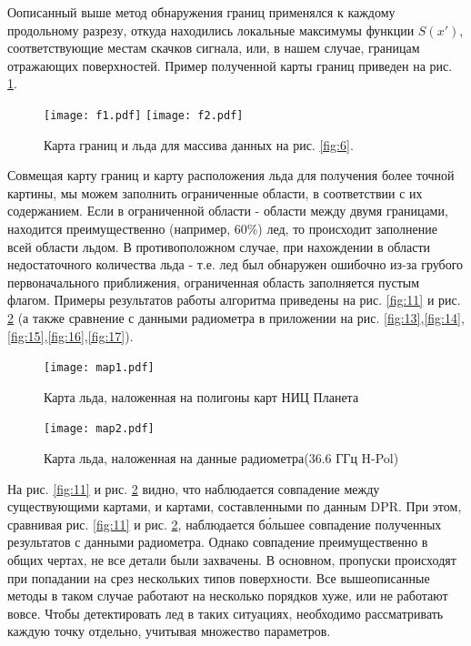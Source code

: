 Оописанный выше метод обнаружения границ применялся к каждому продольному разрезу, откуда находились локальные
максимумы функции $S(x')$, соответствующие местам скачков сигнала, или, в нашем случае, границам отражающих
поверхностей. Пример полученной карты границ приведен на рис. \ref{fig:10}.

\begin{figure}[h!]
  \centering
  \texttt{[image: f1.pdf]}
  \texttt{[image: f2.pdf]}
  \caption{Карта границ и льда для массива данных на рис. \ref{fig:6}.}
  \label{fig:10}
\end{figure}

Совмещая карту границ и карту расположения льда для получения более точной картины, мы можем заполнить ограниченные
области, в соответствии с их содержанием. Если в ограниченной области - области между двумя границами, находится
преимущественно (например, 60\%) лед, то происходит заполнение всей
области льдом. В противоположном случае, при нахождении в области недостаточного количества льда - т.е. лед был
обнаружен ошибочно из-за грубого первоначального приближения, ограниченная область заполняется пустым флагом.
Примеры результатов работы алгоритма приведены на рис. \ref{fig:11} и рис. \ref{fig:12} (а также сравнение с данными радиометра в приложении
на рис. \ref{fig:13},\ref{fig:14},\ref{fig:15},\ref{fig:16},\ref{fig:17}).

\begin{figure}[h!]
  \centering
  \begin{minipage}{0.48\linewidth}
    \texttt{[image: map1.pdf]}
    \caption{Карта льда, наложенная на полигоны карт НИЦ Планета}
    \label{fig:11}
  \end{minipage}
  \begin{minipage}{0.51\linewidth}
    \texttt{[image: map2.pdf]}
    \caption{Карта льда, наложенная на данные радиометра(36.6 ГГц H-Pol)}
    \label{fig:12}
  \end{minipage}

\end{figure}

На рис. \ref{fig:11} и рис. \ref{fig:12} видно, что наблюдается совпадение между существующими картами, и картами, составленными
по данным DPR. При этом, сравнивая рис. \ref{fig:11} и рис. \ref{fig:12}, наблюдается б\'{о}льшее совпадение полученных
результатов с данными радиометра. Однако совпадение преимущественно в общих чертах, не все детали были захвачены. В основном,
пропуски происходят при попадании на срез нескольких типов поверхности. Все вышеописанные методы в таком случае работают на несколько порядков
хуже, или не работают вовсе. Чтобы детектировать лед в таких ситуациях, необходимо рассматривать каждую точку отдельно,
учитывая множество параметров.


